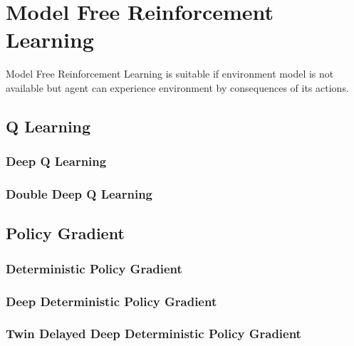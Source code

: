 \section{Model Free Reinforcement Learning}
\label{sec:mf_rl}

Model Free Reinforcement Learning is suitable if environment model is not available but agent can experience environment by consequences of its actions.

\subsection{Q Learning}

\subsubsection{Deep Q Learning}

\subsubsection{Double Deep Q Learning}

\subsection{Policy Gradient}

\subsubsection{Deterministic Policy Gradient}

\subsubsection{Deep Deterministic Policy Gradient}

\subsubsection{Twin Delayed Deep Deterministic Policy Gradient}